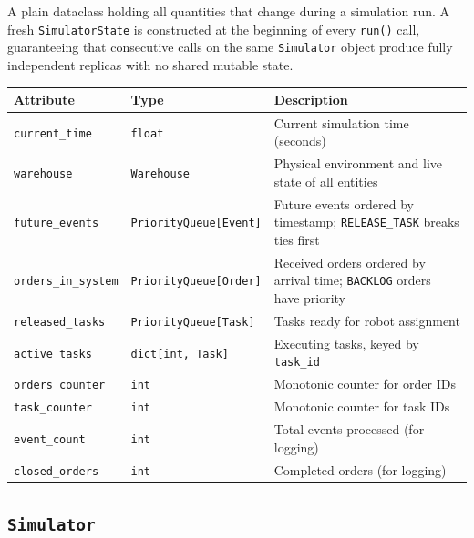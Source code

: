 \documentclass[a4paper,10pt]{article}
\begin{document}
A plain dataclass holding all quantities that change during a simulation run. A fresh \texttt{SimulatorState} is constructed at the beginning of every \texttt{run()} call, guaranteeing that consecutive calls on the same \texttt{Simulator} object produce fully independent replicas with no shared mutable state.

\vspace{0.4em}
\begin{tabularx}{\textwidth}{l l X}
\toprule
\textbf{Attribute} & \textbf{Type} & \textbf{Description} \\
\midrule
\texttt{current\_time}      & \texttt{float}                          & Current simulation time (seconds) \\
\texttt{warehouse}          & \texttt{Warehouse}                      & Physical environment and live state of all entities \\
\texttt{future\_events}     & \texttt{PriorityQueue[Event]}           & Future events ordered by timestamp; \texttt{RELEASE\_TASK} breaks ties first \\
\texttt{orders\_in\_system} & \texttt{PriorityQueue[Order]}           & Received orders ordered by arrival time; \texttt{BACKLOG} orders have priority \\
\texttt{released\_tasks}    & \texttt{PriorityQueue[Task]}            & Tasks ready for robot assignment \\
\texttt{active\_tasks}      & \texttt{dict[int, Task]}                & Executing tasks, keyed by \texttt{task\_id} \\
\texttt{orders\_counter}    & \texttt{int}                            & Monotonic counter for order IDs \\
\texttt{task\_counter}      & \texttt{int}                            & Monotonic counter for task IDs \\
\texttt{event\_count}       & \texttt{int}                            & Total events processed (for logging) \\
\texttt{closed\_orders}     & \texttt{int}                            & Completed orders (for logging) \\
\bottomrule
\end{tabularx}

\subsection{\texttt{Simulator}}
\end{document}
